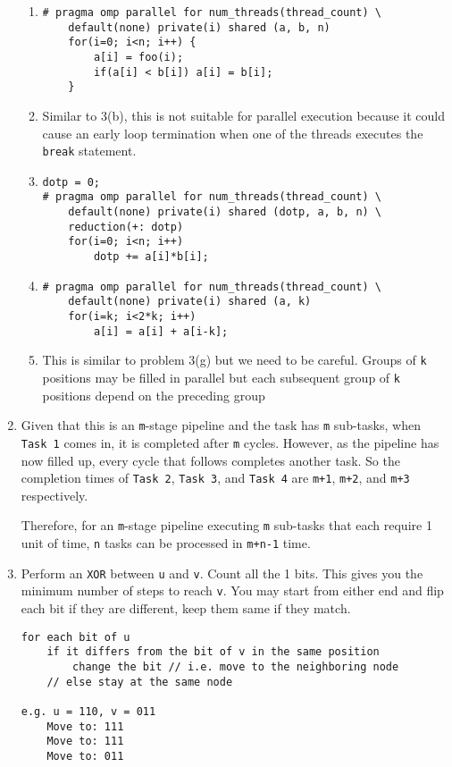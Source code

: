 \documentclass{article}
\begin{document}
\begin{enumerate}
\begin{enumerate}[label=(\alph*)]
    \item
\begin{lstlisting}
# pragma omp parallel for num_threads(thread_count) \
    default(none) private(i) shared (a, b, n)
    for(i=0; i<n; i++) {
        a[i] = foo(i);
        if(a[i] < b[i]) a[i] = b[i];
    }
\end{lstlisting}

    \item
    Similar to 3(b), this is not suitable for parallel execution because it
    could cause an early loop termination when one of the threads executes the 
    \texttt{break} statement.
    
    \item
\begin{lstlisting}
dotp = 0;
# pragma omp parallel for num_threads(thread_count) \
    default(none) private(i) shared (dotp, a, b, n) \
    reduction(+: dotp)
    for(i=0; i<n; i++)
        dotp += a[i]*b[i];
\end{lstlisting}
        
    \item
\begin{lstlisting}
# pragma omp parallel for num_threads(thread_count) \
    default(none) private(i) shared (a, k) 
    for(i=k; i<2*k; i++)
        a[i] = a[i] + a[i-k];
\end{lstlisting}

    \item
    This is similar to problem 3(g) but we need to be careful. Groups of
    \texttt{k} positions may be filled in parallel but each subsequent group of
    \texttt{k} positions depend on the preceding group
    
\end{enumerate} 

\item
Given that this is an \texttt{m}-stage pipeline and the task has \texttt{m} 
sub-tasks, when \texttt{Task 1} comes in, it is completed after \texttt{m} 
cycles. However, as the pipeline has now filled up, every cycle that follows 
completes another task. So the completion times of \texttt{Task 2}, 
\texttt{Task 3}, and \texttt{Task 4} are \texttt{m+1}, \texttt{m+2}, and 
\texttt{m+3} respectively. 

Therefore, for an \texttt{m}-stage pipeline executing \texttt{m} sub-tasks that 
each require 1 unit of time, \texttt{n} tasks can be processed in \texttt{m+n-1}
time.

\item
Perform an \texttt{XOR} between \texttt{u} and \texttt{v}. Count all the 1
bits. This gives you the minimum number of steps to reach \texttt{v}. You may
start from either end and flip each bit if they are different, keep them same if
they match. 

\begin{lstlisting}
for each bit of u
    if it differs from the bit of v in the same position 
        change the bit // i.e. move to the neighboring node
    // else stay at the same node
	
e.g. u = 110, v = 011 
	Move to: 111
	Move to: 111 
	Move to: 011
\end{lstlisting}

\end{enumerate} 
\end{document}

